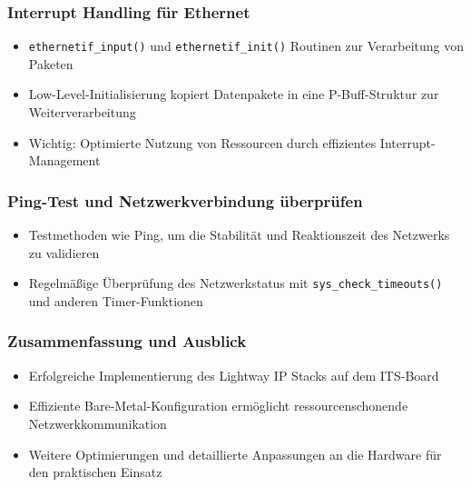 \documentclass{beamer}
\begin{document}
\begin{frame}
\frametitle{Interrupt Handling für Ethernet}
\begin{itemize}
    \item \texttt{ethernetif\_input()} und \texttt{ethernetif\_init()} Routinen zur Verarbeitung von Paketen
    \item Low-Level-Initialisierung kopiert Datenpakete in eine P-Buff-Struktur zur Weiterverarbeitung
    \item Wichtig: Optimierte Nutzung von Ressourcen durch effizientes Interrupt-Management
\end{itemize}
\end{frame}

\begin{frame}
\frametitle{Ping-Test und Netzwerkverbindung überprüfen}
\begin{itemize}
    \item Testmethoden wie Ping, um die Stabilität und Reaktionszeit des Netzwerks zu validieren
    \item Regelmäßige Überprüfung des Netzwerkstatus mit \texttt{sys\_check\_timeouts()} und anderen Timer-Funktionen
\end{itemize}
\end{frame}

\begin{frame}
\frametitle{Zusammenfassung und Ausblick}
\begin{itemize}
    \item Erfolgreiche Implementierung des Lightway IP Stacks auf dem ITS-Board
    \item Effiziente Bare-Metal-Konfiguration ermöglicht ressourcenschonende Netzwerkkommunikation
    \item Weitere Optimierungen und detaillierte Anpassungen an die Hardware für den praktischen Einsatz
\end{itemize}
\end{frame}
\end{document}
